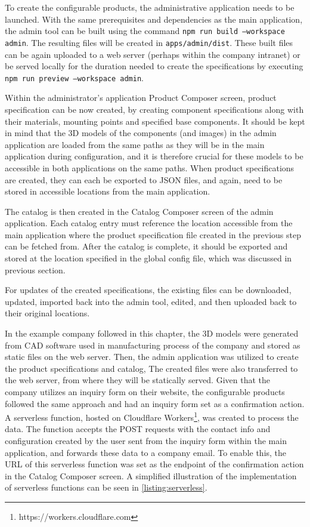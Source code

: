 To create the configurable products, the administrative application needs to be launched. With the same prerequisites and dependencies as the main application, the admin tool can be built using the command \texttt{npm run build --workspace admin}. The resulting files will be created in \texttt{apps/admin/dist}. These built files can be again uploaded to a web server (perhaps within the company intranet) or be served locally for the duration needed to create the specifications by executing \texttt{npm run preview --workspace admin}.

Within the administrator's application Product Composer screen, product specification can be now created, by creating component specifications along with their materials, mounting points and specified base components. It should be kept in mind that the 3D models of the components (and images) in the admin application are loaded from the same paths as they will be in the main application during configuration, and it is therefore crucial for these models to be accessible in both applications on the same paths. When product specifications are created, they can each be exported to JSON files, and again, need to be stored in accessible locations from the main application.

The catalog is then created in the Catalog Composer screen of the admin application. Each catalog entry must reference the location accessible from the main application where the product specification file created in the previous step can be fetched from. After the catalog is complete, it should be exported and stored at the location specified in the global config file, which was discussed in previous section.

For updates of the created specifications, the existing files can be downloaded, updated, imported back into the admin tool, edited, and then uploaded back to their original locations.

In the example company followed in this chapter, the 3D models were generated from CAD software used in manufacturing process of the company and stored as static files on the web server. Then, the admin application was utilized to create the product specifications and catalog, The created files were also transferred to the web server, from where they will be statically served. Given that the company utilizes an inquiry form on their website, the configurable products followed the same approach and had an inquiry form set as a confirmation action. A serverless function, hosted on Cloudflare Workers\footnote{https://workers.cloudflare.com}, was created to process the data. The function accepts the POST requests with the contact info and configuration created by the user sent from the inquiry form within the main application, and forwards these data to a company email. To enable this, the URL of this serverless function was set as the endpoint of the confirmation action in the Catalog Composer screen. A simplified illustration of the implementation of serverless functions can be seen in \autoref{listing:serverless}.

